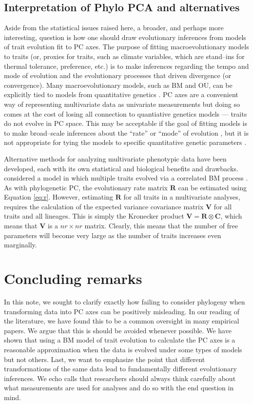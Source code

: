 \documentclass[a4paper,12pt]{article}
\begin{document}
\subsection{Interpretation of Phylo PCA and alternatives}
Aside from the statistical issues raised here, a broader, and perhaps more interesting, question is how one should draw evolutionary inferences from models of trait evolution fit to PC axes. The purpose of fitting macroevolutionary models to traits (or, proxies for traits, such as climate variables, which are stand--ins for thermal tolerance, preference, etc.) is to make inferences regarding the tempo and mode of evolution and the evolutionary processes that driven divergence (or convergence). Many macroevolutionary models, such as BM and OU, can be explicitly tied to models from quantitative genetics \citep{HansenMartins1996, PennellHarmon, PennellPE}. PC axes are a convenient way of representing multivariate data as univariate measurements but doing so comes at the cost of losing all connection to quantiative genetics models --- traits do not evolve in PC space. This may be acceptable if the goal of fitting models is to make broad--scale inferences about the ``rate'' or ``mode'' of evolution \citep{Hunt2012}, but it is not appropriate for tying the models to specific quantitative genetic parameters \citep[\emph{sensu}][]{EstesArnold2007, PennellPE}.

Alternative methods for analyzing multivariate phenotypic data have been developed, each with its own statistical and biological benefits and drawbacks. \citet{RevellHarmon} considered a model in which multiple traits evolved via a correlated BM process \citep[see also][]{Motmot}. As with phylogenetic PC, the evolutionary rate matrix $\mathbf{R}$ can be estimated using Equation \ref{eq:r}. However, estimating $\mathbf{R}$ for all traits in a multivariate analyses, requires the calculation of the expected variance covariance matrix $\mathbf{V}$ for all traits and all lineages. This is simply the Kronecker product $\mathbf{V} = \mathbf{R} \otimes \mathbf{C}$, which means that $\mathbf{V}$ is a $n r \times n  r$ matrix. Clearly, this means that the number of free parameters will become very large as the number of traits increases even marginally.

\section{Concluding remarks}
In this note, we sought to clarify exactly how failing to consider phylogeny when transforming data into PC axes can be positively misleading. In our reading of the literature, we have found this to be a common oversight in many empirical papers. We argue that this is should be avoided whenever possible. We have shown that using a BM model of trait evolution to calculate the PC axes is a reasonable approximation when the data is evolved under some types of models but not others. Last, we want to emphasize the point that different transformations of the same data lead to fundamentally different evolutionary inferences. We echo calls \citep{HansenHoule2008, Houle2011} that researchers should always think carefully about what measurements are used for analyses and do so with the end question in mind.



\end{document}
